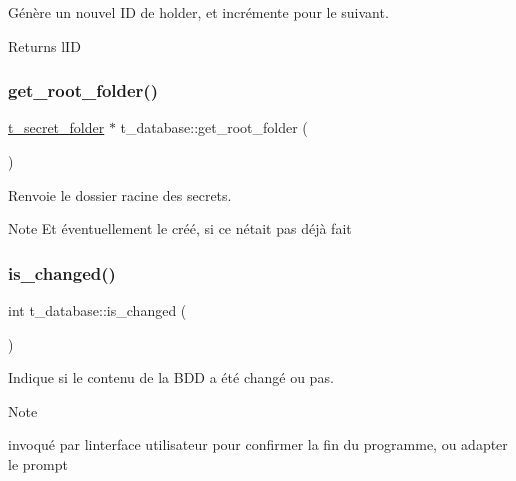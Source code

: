 Génère un nouvel ID de holder, et incrémente pour le suivant. 

\begin{DoxyReturn}{Returns}
l\textquotesingle{}ID 
\end{DoxyReturn}
\mbox{\label{classt__database_a53053bb8dc905324186817c5318288bb}} 
\subsubsection{\texorpdfstring{get\+\_\+root\+\_\+folder()}{get\_root\_folder()}}
{\footnotesize\ttfamily \hyperlink{classt__secret__folder}{t\+\_\+secret\+\_\+folder} $\ast$ t\+\_\+database\+::get\+\_\+root\+\_\+folder (\begin{DoxyParamCaption}{ }\end{DoxyParamCaption})}



Renvoie le dossier racine des secrets. 

\begin{DoxyNote}{Note}
Et éventuellement le créé, si ce n\textquotesingle{}était pas déjà fait 
\end{DoxyNote}
\mbox{\label{classt__database_a1fa795936fbed825f43edb5d05457034}} 
\subsubsection{\texorpdfstring{is\+\_\+changed()}{is\_changed()}}
{\footnotesize\ttfamily int t\+\_\+database\+::is\+\_\+changed (\begin{DoxyParamCaption}{ }\end{DoxyParamCaption})}



Indique si le contenu de la B\+DD a été changé ou pas. 

\begin{DoxyNote}{Note}

\begin{DoxyItemize}
\item invoqué par l\textquotesingle{}interface utilisateur pour confirmer la fin du programme, ou adapter le prompt 
\end{DoxyItemize}
\end{DoxyNote}
\mbox{\label{classt__database_a22b32d446f8e07101c81354517502467}} 
